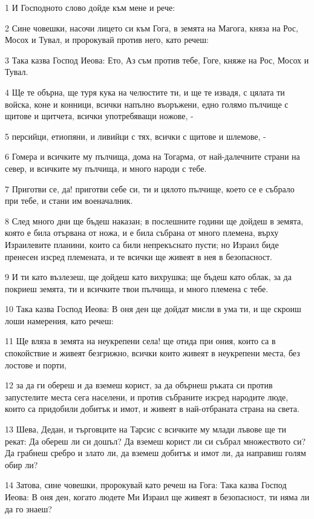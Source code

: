 \par 1 И Господното слово дойде към мене и рече:
\par 2 Сине човешки, насочи лицето си към Гога, в земята на Магога, княза на Рос, Мосох и Тувал, и пророкувай против него, като речеш:
\par 3 Така казва Господ Иеова: Ето, Аз съм против тебе, Гоге, княже на Рос, Мосох и Тувал.
\par 4 Ще те обърна, ще туря кука на челюстите ти, и ще те извадя, с цялата ти войска, коне и конници, всички напълно въоръжени, едно голямо пълчище с щитове и щитчета, всички употребяващи ножове, -
\par 5 персийци, етиопяни, и ливийци с тях, всички с щитове и шлемове, -
\par 6 Гомера и всичките му пълчища, дома на Тогарма, от най-далечните страни на север, и всичките му пълчища, и много народи с тебе.
\par 7 Приготви се, да! приготви себе си, ти и цялото пълчище, което се е събрало при тебе, и стани им военачалник.
\par 8 След много дни ще бъдеш наказан; в послешните години ще дойдеш в земята, която е била отървана от ножа, и е била събрана от много племена, върху Израилевите планини, които са били непрекъснато пусти; но Израил биде пренесен изсред племената, и те всички ще живеят в нея в безопасност.
\par 9 И ти като възлезеш, ще дойдеш като вихрушка; ще бъдеш като облак, за да покриеш земята, ти и всичките твои пълчища, и много племена с тебе.
\par 10 Така казва Господ Иеова: В оня ден ще дойдат мисли в ума ти, и ще скроиш лоши намерения, като речеш:
\par 11 Ще вляза в земята на неукрепени села! ще отида при ония, които са в спокойствие и живеят безгрижно, всички които живеят в неукрепени места, без лостове и порти,
\par 12 за да ги обереш и да вземеш корист, за да обърнеш ръката си против запустелите места сега населени, и против събраните изсред народите люде, които са придобили добитък и имот, и живеят в най-отбраната страна на света.
\par 13 Шева, Дедан, и търговците на Тарсис с всичките му млади лъвове ще ти рекат: Да обереш ли си дошъл? Да вземеш корист ли си събрал множеството си? Да грабнеш сребро и злато ли, да вземеш добитък и имот ли, да направиш голям обир ли?
\par 14 Затова, сине човешки, пророкувай като речеш на Гога: Така казва Господ Иеова: В оня ден, когато людете Ми Израил ще живеят в безопасност, ти няма ли да го знаеш?
